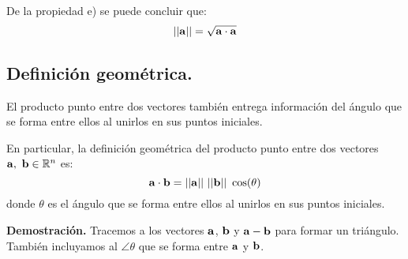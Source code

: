 \documentclass[12pt]{article}
\begin{document}
De la propiedad e) se puede concluir que:
\[
  ||\mathbf{a}|| = \sqrt{\mathbf{a} \cdot \mathbf{a}}
\]

\subsection{Definición geométrica.}

El producto punto entre dos vectores también entrega información del ángulo que se forma entre ellos al unirlos en sus puntos iniciales.

En particular, la definición geométrica del producto punto entre dos vectores $\mathbf{a}, \ \mathbf{b} \in \mathbb{R}^{n}$ es:
\[
  \mathbf{a} \cdot \mathbf{b} = ||\mathbf{a}|| \ ||\mathbf{b}|| \ \cos(\theta)
\]
donde $\theta$ es el ángulo que se forma entre ellos al unirlos en sus puntos iniciales.

\textbf{Demostración.} Tracemos a los vectores $\mathbf{a}$, $\mathbf{b}$ y $\mathbf{a} - \mathbf{b}$ para formar un triángulo. También incluyamos al $\angle \theta$ que se forma entre $\mathbf{a}$ y $\mathbf{b}$.

\begin{figure}[hbt!]
\centering


\end{figure}
\end{document}
